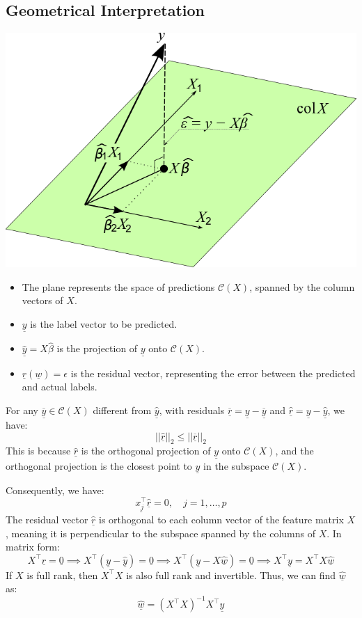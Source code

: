 \subsection*{Geometrical Interpretation}
\begin{center} \includegraphics[scale = 0.4]{../images/OLS_geometric_interpretation.png} \end{center}
\begin{itemize}
    \item The plane represents the space of predictions $\mathcal{C}(X)$, spanned by the column vectors of $X$.
    \item $\underline{y}$ is the label vector to be predicted.
    \item $\hat{\underline{y}} = X\hat{\beta}$ is the projection of $\underline{y}$ onto $\mathcal{C}(X)$.
    \item $\underline{r}(\underline{w}) = \epsilon$ is the residual vector, representing the error between the predicted and actual labels.
\end{itemize}
For any $\underline{\overline{y}} \in \mathcal{C}(X)$ different from $\hat{\underline{y}}$, with residuals $\underline{\overline{r}} = \underline{y} - \underline{\overline{y}}$ and $\underline{\hat{r}} = \underline{y} - \underline{\hat{y}}$, we have:
\[
    ||\underline{\hat{r}}||_2 \leq ||\underline{\overline{r}}||_2
\]
This is because $\underline{\hat{r}}$ is the orthogonal projection of $\underline{y}$ onto $\mathcal{C}(X)$, and the orthogonal projection is the closest point to $\underline{y}$ in the subspace $\mathcal{C}(X)$.

Consequently, we have:
\[
    \underline{x_j^\intercal}\underline{\hat{r}} = 0, \quad j = 1, \dots, p    
\]
The residual vector $\underline{\hat{r}}$ is orthogonal to each column vector of the feature matrix $X$, meaning it is perpendicular to the subspace spanned by the columns of $X$.
In matrix form:
\[
    X^\intercal \underline{\hat{r}} = \underline{0} \implies X^\intercal (\underline{y} - \underline{\hat{y}}) = \underline{0} \implies X^\intercal (\underline{y} - X\underline{\hat{w}}) = \underline{0} \implies X^\intercal \underline{y} = X^\intercal X \underline{\hat{w}}
\]
If $X$ is full rank, then $X^\intercal X$ is also full rank and invertible. Thus, we can find $\hat{\underline{w}}$ as:
\[
    \hat{\underline{w}} = (X^\intercal X)^{-1}X^\intercal \underline{y}
\]


